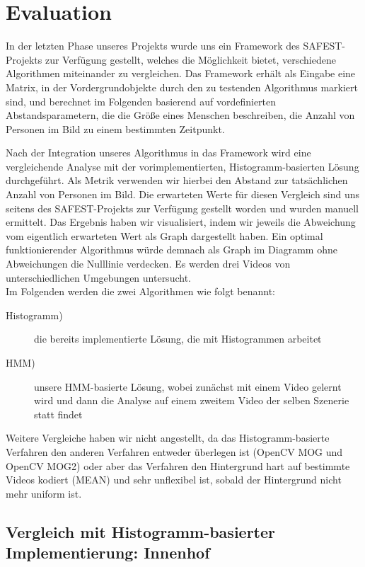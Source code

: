 \section{Evaluation}
\label{chap:evaluation}
In der letzten Phase unseres Projekts wurde uns ein Framework des SAFEST-Projekts\cite{safest} zur Verfügung gestellt, welches die Möglichkeit bietet, verschiedene Algorithmen miteinander zu vergleichen. Das Framework erhält als Eingabe eine Matrix, in der Vordergrundobjekte durch den zu testenden  Algorithmus markiert sind, und berechnet im Folgenden basierend auf vordefinierten Abstandsparametern, die die Größe eines Menschen beschreiben, die Anzahl von Personen im Bild zu einem bestimmten Zeitpunkt.

Nach der Integration unseres Algorithmus in das Framework wird eine vergleichende Analyse mit der vorimplementierten, Histogramm-basierten Lösung durchgeführt. Als Metrik verwenden wir hierbei den Abstand zur tatsächlichen Anzahl von Personen im Bild. Die erwarteten Werte für diesen Vergleich sind uns seitens des SAFEST-Projekts\cite{safest} zur Verfügung gestellt worden und wurden manuell ermittelt. Das Ergebnis haben wir visualisiert, indem wir jeweils die Abweichung vom eigentlich erwarteten Wert als Graph dargestellt haben. Ein optimal funktionierender Algorithmus würde demnach als Graph im Diagramm ohne Abweichungen die Nulllinie verdecken. Es werden drei Videos von unterschiedlichen Umgebungen untersucht.\\
Im Folgenden werden die zwei Algorithmen wie folgt benannt:
\begin{description}
	\item[Histogramm)] die bereits implementierte Lösung, die mit Histogrammen arbeitet
	\item[HMM)] unsere HMM-basierte Lösung, wobei zunächst mit einem Video gelernt wird und dann die Analyse auf einem zweitem Video der selben Szenerie statt findet
\end{description}
Weitere Vergleiche haben wir nicht angestellt, da das Histogramm-basierte Verfahren den anderen Verfahren entweder überlegen ist (OpenCV MOG und OpenCV MOG2) oder aber das Verfahren den Hintergrund hart auf bestimmte Videos kodiert (MEAN) und sehr unflexibel ist, sobald der Hintergrund nicht mehr uniform ist.

\subsection{Vergleich mit Histogramm-basierter Implementierung: Innenhof}
\label{sec:eval_innenhof}

